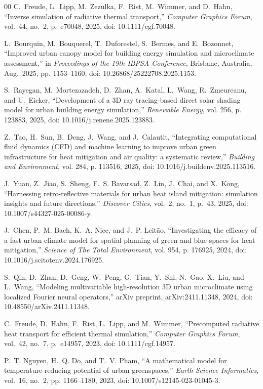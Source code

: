 \documentclass[conference]{IEEEtran}
\begin{document}
\begin{thebibliography}{00}
C.~Freude, L.~Lipp, M.~Zezulka, F.~Rist, M.~Wimmer, and D.~Hahn, ``Inverse simulation of radiative thermal transport,'' \emph{Computer Graphics Forum}, vol.~44, no.~2, p.~e70048, 2025, doi: 10.1111/cgf.70048.

L.~Bourquin, M.~Bouquerel, T.~Duforestel, S.~Bermes, and E.~Bozonnet, ``Improved urban canopy model for building energy simulation and microclimate assessment,'' in \emph{Proceedings of the 19th IBPSA Conference}, Brisbane, Australia, Aug.~2025, pp. 1153--1160, doi: 10.26868/25222708.2025.1153.

S.~Rayegan, M.~Mortezazadeh, D.~Zhan, A.~Katal, L.~Wang, R.~Zmeureanu, and U.~Eicker, ``Development of a 3D ray tracing-based direct solar shading model for urban building energy simulation,'' \emph{Renewable Energy}, vol. 256, p. 123883, 2025, doi: 10.1016/j.renene.2025.123883.

Z.~Tao, H.~Sun, B.~Deng, J.~Wang, and J.~Calautit, ``Integrating computational fluid dynamics (CFD) and machine learning to improve urban green infrastructure for heat mitigation and air quality: a systematic review,'' \emph{Building and Environment}, vol. 284, p. 113516, 2025, doi: 10.1016/j.buildenv.2025.113516.

J.~Yuan, Z.~Jiao, S.~Sheng, F.~S. Bavarsad, Z.~Lin, J.~Chai, and X.~Kong, ``Harnessing retro-reflective materials for urban heat island mitigation: simulation insights and future directions,'' \emph{Discover Cities}, vol.~2, no.~1, p.~43, 2025, doi: 10.1007/s44327-025-00086-y.

J.~Chen, P.~M. Bach, K.~A. Nice, and J.~P. Leit{\~a}o, ``Investigating the efficacy of a fast urban climate model for spatial planning of green and blue spaces for heat mitigation,'' \emph{Science of The Total Environment}, vol. 954, p. 176925, 2024, doi: 10.1016/j.scitotenv.2024.176925.

S.~Qin, D.~Zhan, D.~Geng, W.~Peng, G.~Tian, Y.~Shi, N.~Gao, X.~Liu, and L.~Wang, ``Modeling multivariable high-resolution 3D urban microclimate using localized Fourier neural operators,'' arXiv preprint, arXiv:2411.11348, 2024, doi: 10.48550/arXiv.2411.11348.

C.~Freude, D.~Hahn, F.~Rist, L.~Lipp, and M.~Wimmer, ``Precomputed radiative heat transport for efficient thermal simulation,'' \emph{Computer Graphics Forum}, vol.~42, no.~7, p.~e14957, 2023, doi: 10.1111/cgf.14957.

P.~T. Nguyen, H.~Q. Do, and T.~V. Pham, ``A mathematical model for temperature-reducing potential of urban greenspaces,'' \emph{Earth Science Informatics}, vol.~16, no.~2, pp. 1166--1180, 2023, doi: 10.1007/s12145-023-01045-3.

\end{thebibliography}
\end{document}
